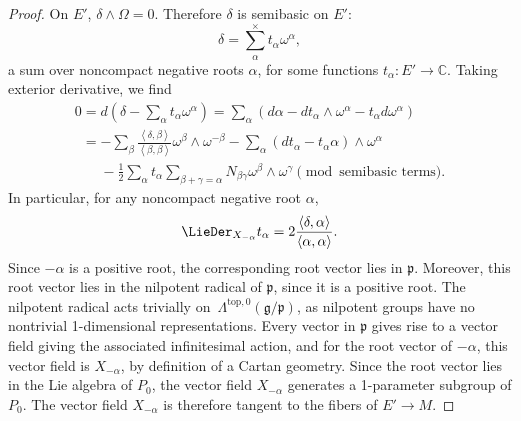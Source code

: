 \begin{proof}
On $E'$, $\delta \wedge \Omega = 0$.
Therefore $\delta$ is semibasic on $E'$:
\[
\delta = \sum^{\times}_{\alpha} t_{\alpha} \omega^{\alpha},
\]
a sum over noncompact negative roots $\alpha$, for some
functions $t_{\alpha} : E' \to \mathbb{C}.$
Taking exterior derivative, we f\/ind
\begin{gather*}
0 =
d \left(\delta - \sum _{\alpha} t_{\alpha} \omega^{\alpha} \right)
 = \sum_{\alpha}
\left(
d \alpha
-
dt_{\alpha} \wedge \omega^{\alpha}
- t_{\alpha} d \omega^{\alpha}
\right)
\\
\phantom{0}{} =
-
\sum_{\beta} \frac{\left<\delta,\beta\right>}
{\left<\beta,\beta\right>} \omega^{\beta} \wedge \omega^{-\beta}
-
\sum_{\alpha}
\left(dt_{\alpha} - t_{\alpha} \alpha\right) \wedge \omega^{\alpha}
\\
\phantom{0=}{} - \frac{1}{2}
\sum_{\alpha} t_{\alpha}
\sum_{\beta + \gamma=\alpha} N_{\beta \gamma} \omega^{\beta} \wedge \omega^{\gamma}
\pmod{\text{semibasic terms}}.
\end{gather*}
In particular, for any noncompact negative root $\alpha$,
\[
\LieDer_{X_{-\alpha}} t_{\alpha} = 2 \frac{\left<\delta,\alpha\right>}{\left<\alpha,\alpha\right>}.
\]
Since $-\alpha$ is a positive root, the corresponding root vector
lies in $\mathfrak{p}$. Moreover, this root vector lies in the
nilpotent radical of $\mathfrak{p}$, since it is a positive root.
The nilpotent radical acts trivially on~$\Lambda^{\text{top},0}\left(\mathfrak{g}/\mathfrak{p}\right)$,
as nilpotent groups have no nontrivial 1-dimensional representations.
Every vector in $\mathfrak{p}$ gives rise to a vector f\/ield
giving the associated inf\/initesimal action, and for the root
vector of $-\alpha$, this vector f\/ield is $X_{-\alpha}$,
by def\/inition of a Cartan geometry. Since the root
vector lies in the Lie algebra of $P_0$, the vector f\/ield
$X_{-\alpha}$ generates a 1-parameter subgroup of $P_0$.
The vector f\/ield $X_{-\alpha}$ is therefore
tangent to the f\/ibers of $E' \to M$.


\end{proof}
